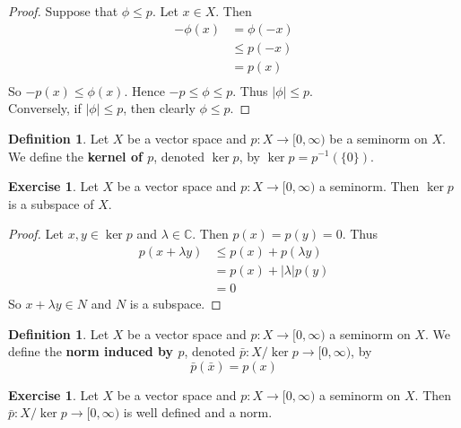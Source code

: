 \documentclass[12pt]{amsart}
\theoremstyle{definition}
\newtheorem{defn}[definition]{Definition}
\newtheorem{ex}[definition]{Exercise}
\newcommand{\lam}{\lambda}
\newcommand{\C}{\mathbb{C}}
\newcommand{\tbf}[1]{\textbf{#1}}
\newcommand{\Rg}{[0,\infty)}
\DeclareMathOperator*{\0}{\mbf{0}}
\DeclareMathOperator*{\1}{\mbf{1}}
\begin{document}
	\begin{proof}
		Suppose that $\phi \leq p$. Let $x \in X$. Then 
		\begin{align*}
			-\phi(x)
			& = \phi(-x) \\
			& \leq p(-x) \\
			& = p(x) \\
		\end{align*}
		So $-p(x) \leq \phi(x)$. Hence $-p \leq \phi \leq p$. Thus $|\phi| \leq p$. \\
		Conversely, if $|\phi| \leq p$, then clearly $\phi \leq p$.
	\end{proof}
	
	\begin{defn}
		Let $X$ be a vector space and $p:X \rightarrow \Rg$ be a seminorm on $X$. We define the \tbf{kernel of $p$}, denoted $\ker p$, by $\ker p = p^{-1}(\{0\})$.
	\end{defn}
	
	\begin{ex}
		Let $X$ be a vector space and $p: X \rightarrow \Rg$ a seminorm. Then $\ker p$ is a subspace of $X$.
	\end{ex}
	
	\begin{proof}
		Let $x, y \in \ker p$ and $\lam \in \C$. Then $p(x) = p(y) = 0$. Thus 
		\begin{align*}
			p(x + \lam y) 
			&\leq p(x) + p(\lam y) \\
			&= p(x) + |\lam|p(y) \\
			&= 0
		\end{align*} 
		So $x + \lam y \in N$ and $N$ is a subspace.
	\end{proof}
	
	
	\begin{defn}
		Let $X$ be a vector space and $p:X \rightarrow [0, \infty)$ a seminorm on $X$. We define the \tbf{norm induced by $p$}, denoted $\bar{p} : X / \ker p \rightarrow  \Rg$, by $$\bar{p}(\bar{x}) = p(x)$$
	\end{defn}
	
	\begin{ex}
		Let $X$ be a vector space and $p:X \rightarrow [0, \infty)$ a seminorm on $X$. Then $\bar{p} : X / \ker p \rightarrow  \Rg$ is well defined and a norm. 
	\end{ex}
	
\end{document}
